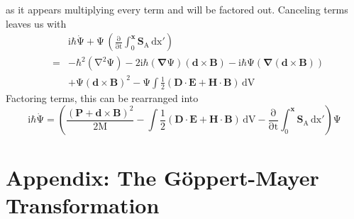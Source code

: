 \documentclass[twocolumn,english,pra,aps,superscriptaddress,floatfix]{revtex4-1}
\begin{document}
as it appears multiplying every term and will be factored out.  Canceling terms leaves us with
\begin{eqnarray}
&&\mathrm{\mathrm{i}\mathrm{\hbar}\dot{\Psi}+\Psi\,\left(\frac{\partial}{\partial t}\mathrm{\int_0^\mathbf{x} \mathbf{S}_A \, \mathrm{dx'}}\right)}\nonumber \\
&=&\mathrm{-\hbar^2(\nabla^2\Psi) -2i\hbar(\mathbf{\nabla}\Psi)(\mathbf{d}\times\mathbf{B})-i\hbar\Psi(\mathbf{\nabla}(\mathbf{d}\times\mathbf{B}))}\nonumber \\
&&\mathrm{+\Psi(\mathbf{d}\times\mathbf{B})^2-\Psi\int\frac{1}{2}\left(\mathbf{D\cdot E +H\cdot B}\right)\,dV}
\label{schrodingera3}
\end{eqnarray}
Factoring terms, this can be rearranged into
\begin{equation}
\mathrm{i\mathrm{\hbar}\dot{\Psi}=\mathrm{\left(\frac{\left(\mathbf{P}+\mathbf{d}\times\mathbf{B}\right)^2}{2M}-\int\frac{1}{2}\left(\mathbf{D\cdot E}+\mathbf{H\cdot B}\right)\,dV-\frac{\partial}{\partial t}\int_0^\mathbf{x} \mathbf{S}_A\,\mathrm{dx'}\right)\Psi}}
\label{schrodingera4}
\end{equation}

\section{Appendix: The G\"{o}ppert-Mayer Transformation }
\end{document}
